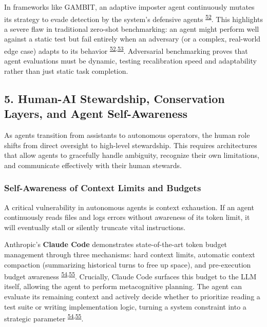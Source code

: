 \documentclass[
  11pt,
]{article}
\begin{document}
In frameworks like GAMBIT, an adaptive imposter agent continuously
mutates its strategy to evade detection by the system's defensive agents
\textsuperscript{\protect\hyperlink{cite-52}{52}}. This highlights a
severe flaw in traditional zero-shot benchmarking: an agent might
perform well against a static test but fail entirely when an adversary
(or a complex, real-world edge case) adapts to its behavior
\textsuperscript{\protect\hyperlink{cite-52}{52},\protect\hyperlink{cite-53}{53}}.
Adversarial benchmarking proves that agent evaluations must be dynamic,
testing recalibration speed and adaptability rather than just static
task completion.

\hypertarget{human-ai-stewardship-conservation-layers-and-agent-self-awareness}{%
\subsection{5. Human-AI Stewardship, Conservation Layers, and Agent
Self-Awareness}\label{human-ai-stewardship-conservation-layers-and-agent-self-awareness}}

As agents transition from assistants to autonomous operators, the human
role shifts from direct oversight to high-level stewardship. This
requires architectures that allow agents to gracefully handle ambiguity,
recognize their own limitations, and communicate effectively with their
human stewards.

\hypertarget{self-awareness-of-context-limits-and-budgets}{%
\subsubsection{Self-Awareness of Context Limits and
Budgets}\label{self-awareness-of-context-limits-and-budgets}}

A critical vulnerability in autonomous agents is context exhaustion. If
an agent continuously reads files and logs errors without awareness of
its token limit, it will eventually stall or silently truncate vital
instructions.

Anthropic's \textbf{Claude Code} demonstrates state-of-the-art token
budget management through three mechanisms: hard context limits,
automatic context compaction (summarizing historical turns to free up
space), and pre-execution budget awareness
\textsuperscript{\protect\hyperlink{cite-54}{54},\protect\hyperlink{cite-55}{55}}.
Crucially, Claude Code surfaces this budget to the LLM itself, allowing
the agent to perform metacognitive planning. The agent can evaluate its
remaining context and actively decide whether to prioritize reading a
test suite or writing implementation logic, turning a system constraint
into a strategic parameter
\textsuperscript{\protect\hyperlink{cite-54}{54},\protect\hyperlink{cite-55}{55}}.
\end{document}
